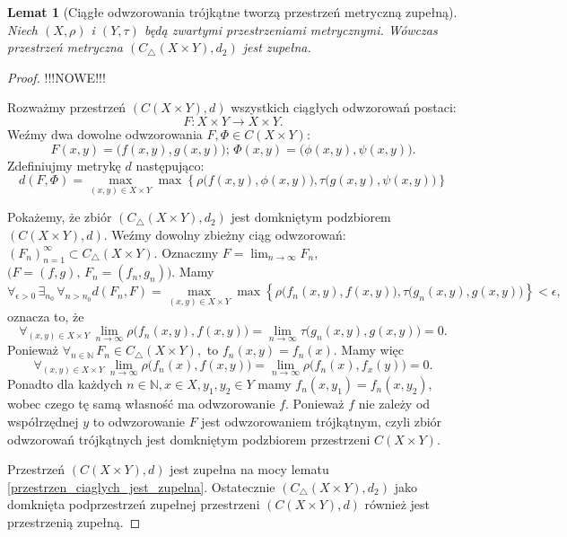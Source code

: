 \documentclass[licencjacka]{pwr_wmat_praca_dyplomowa}
\theoremstyle{plain}
\numberwithin{theorem}{chapter}
\newtheorem{lemma}[theorem]{Lemat}
\theoremstyle{definition}
\numberwithin{theorem}{chapter}
\begin{document}
\begin{lemma}[Ciągłe odwzorowania trójkątne tworzą przestrzeń metryczną zupełną]
\label{ciagle_trojkatne_tworza_przestrzen_metryczna_zupelna}
Niech $(X, \rho)$ i $(Y, \tau)$ będą zwartymi przestrzeniami metrycznymi.
Wówczas przestrzeń metryczna $(C_\triangle(X \times Y), d_2)$ jest zupełna.
\end{lemma}

\begin{proof}
{\color{red} !!!NOWE!!!


Rozważmy przestrzeń $(C(X \times Y), d)$ wszystkich ciągłych odwzorowań postaci: 
$$F: X \times Y \rightarrow X \times Y.$$ 
Weźmy dwa dowolne odwzorowania $F, \Phi \in C(X \times Y)$: 
$$F(x,y) = \big(f(x,y), g(x,y)\big); \, \Phi(x,y) = \big(\phi(x,y), \psi(x,y)\big).$$
Zdefiniujmy metrykę $d$ następująco:
$$d(F, \Phi) = \max_{(x,y) \in X \times Y} \max \left\{ \rho\big(f(x,y), \phi(x,y)\big), \tau\big(g(x,y), \psi(x,y)\big) \right\}$$ 


Pokażemy, że zbiór $(C_\triangle(X \times Y), d_2)$ jest domkniętym podzbiorem $(C(X \times Y), d).$ Weźmy dowolny zbieżny ciąg odwzorowań: $(F_n)_{n=1}^{\infty} \subset C_\triangle(X \times Y).$ Oznaczmy $F = \lim_{n \rightarrow \infty} F_n,$ $\big(F=(f,g), \, F_n=(f_n, g_n)\big).$
Mamy 
$$\forall_{\epsilon > 0} \, \exists_{n_0} \, \forall_{n > n_0} d(F_n, F) = \max_{(x,y) \in X \times Y} \max \left\{ \rho\big(f_n(x,y), f(x,y)\big), \tau\big(g_n(x,y), g(x,y)\big) \right\} < \epsilon,$$
oznacza to, że 
$$\forall_{(x,y) \in X \times Y} \, \lim_{n \rightarrow \infty} \rho\big(f_n(x,y), f(x,y)\big) = \lim_{n \rightarrow \infty} \tau\big(g_n(x,y), g(x,y)\big) = 0.$$
Ponieważ $\forall_{n \in \mathbb{N}} \, F_n \in C_\triangle(X \times Y),$ to $f_n(x,y) = f_n(x).$ 
Mamy więc 
$$\forall_{(x,y) \in X \times Y} \, \lim_{n \rightarrow \infty} \rho\big(f_n(x), f(x,y)\big) = \lim_{n \rightarrow \infty} \rho\big(f_n(x), f_x(y)\big) = 0.$$
{\color{blue}
Ponadto dla każdych $n \in \mathbb{N}, x \in X, y_1, y_2 \in Y$ mamy $f_n(x, y_1) = f_n(x, y_2),$ wobec czego tę samą własność ma odwzorowanie $f.$ Ponieważ $f$ nie zależy od współrzędnej $y$ to odwzorowanie $F$ jest odwzorowaniem trójkątnym, czyli zbiór odwzorowań trójkątnych jest domkniętym podzbiorem przestrzeni $C(X \times Y).$}

Przestrzeń $(C(X \times Y), d)$ jest zupełna na mocy lematu \ref{przestrzen_ciaglych_jest_zupelna}. Ostatecznie $(C_\triangle(X \times Y), d_2)$ jako domknięta podprzestrzeń zupełnej przestrzeni $(C(X \times Y), d)$ również jest przestrzenią zupełną.

}
\end{proof}
\end{document}
